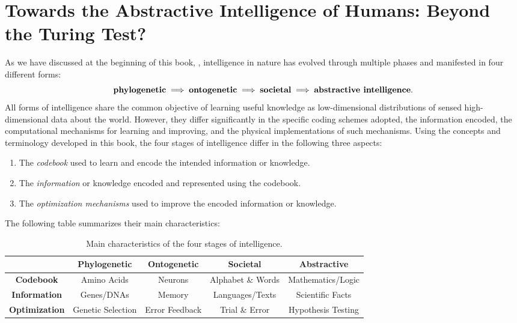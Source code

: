 \documentclass[../../book-main.tex]{subfiles}
\begin{document}
\section{Towards the Abstractive Intelligence of Humans: Beyond the Turing Test?}
As we have discussed at the beginning of this book, , intelligence in nature has evolved through multiple phases and manifested in four different forms:
\begin{equation}
    \text{\textbf{phylogenetic}} \;
    \Longrightarrow \; \text{\textbf{ontogenetic}} \; 
    \Longrightarrow \; \text{\textbf{societal}} \; 
    \Longrightarrow \; \text{\textbf{abstractive intelligence}}.
\end{equation}
All forms of intelligence share the common objective of learning useful knowledge as low-dimensional distributions of sensed high-dimensional data about the world. However, they differ significantly in the specific coding schemes adopted, the information encoded, the computational mechanisms for learning and improving, and the physical implementations of such mechanisms. Using the concepts and terminology developed in this book, the four stages of intelligence differ in the following three aspects:
\begin{enumerate}
    \item The \textit{codebook} used to learn and encode the intended information or knowledge.
    \item The \textit{information} or knowledge encoded and represented using the codebook. 
    \item The \textit{optimization mechanisms} used to improve the encoded information or knowledge.
\end{enumerate}
The following table summarizes their main characteristics:
\begin{table}[h]
    \centering
    \begin{tabular}{| c | c | c | c | c |}
    \hline & \textbf{Phylogenetic} & \textbf{Ontogenetic} & \textbf{Societal} & \textbf{Abstractive}\\
    \hline
    \textbf{Codebook}  & Amino Acids & Neurons & Alphabet \& Words & Mathematics/Logic \\ [0.5ex]
    \hline 
    \textbf{Information} & Genes/DNAs & Memory & Languages/Texts & Scientific Facts\\ [0.5ex]
    \hline
    \textbf{Optimization} & Genetic Selection & Error Feedback & Trial \& Error & Hypothesis Testing \\  [0.5ex]
    \hline
    \end{tabular}
    \caption{Main characteristics of the four stages of intelligence.}    
\end{table}
\end{document}
